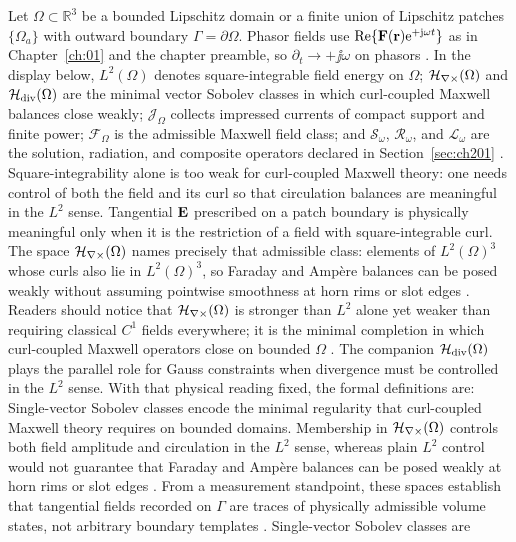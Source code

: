 Let \(\Omega\subset\mathbb{R}^{3}\) be a bounded Lipschitz domain or a finite union of Lipschitz patches \(\{\Omega_a\}\) with outward boundary \(\Gamma=\partial\Omega\). Phasor fields use \(\Re\{\mathbf{F}(\mathbf{r})\mathrm{e}^{+\mathrm{j}\omega t}\}\) as in Chapter~\ref{ch:01} and the chapter preamble, so \(\partial_t\to+\jj\omega\) on phasors \cite{stratton1941}.
In the display below, \(L^{2}(\Omega)\) denotes square-integrable field energy on \(\Omega\);
\(\mathcal{H}_{\nabla\times}(\Omega)\) and \(\mathcal{H}_{\mathrm{div}}(\Omega)\) are the minimal vector Sobolev classes in which
curl-coupled Maxwell balances close weakly; \(\mathcal{J}_\Omega\) collects impressed
currents of compact support and finite power; \(\mathcal{F}_\Omega\) is the admissible
Maxwell field class; and \(\mathcal{S}_\omega\), \(\mathcal{R}_\omega\), and
\(\mathcal{L}_\omega\) are the solution, radiation, and composite operators declared in
Section~\ref{sec:ch201} \cite{stratton1941}.
Square-integrability alone is too weak for curl-coupled Maxwell theory: one needs
control of both the field and its curl so that circulation balances are meaningful
in the \(L^{2}\) sense.
Tangential \(\mathbf{E}\) prescribed on a patch boundary is physically meaningful only when it is
the restriction of a field with square-integrable curl. The space \(\mathcal{H}_{\nabla\times}(\Omega)\) names
precisely that admissible class:
elements of \(L^{2}(\Omega)^{3}\) whose curls also lie in \(L^{2}(\Omega)^{3}\), so
Faraday and Amp\`ere balances can be posed weakly without assuming pointwise smoothness
at horn rims or slot edges \cite{stratton1941}. Readers should notice that
\(\mathcal{H}_{\nabla\times}(\Omega)\) is stronger than \(L^{2}\) alone yet weaker than requiring classical
\(C^{1}\) fields everywhere; it is the minimal completion in which curl-coupled
Maxwell operators close on bounded \(\Omega\) \cite{harrington2001}. The companion
\(\mathcal{H}_{\mathrm{div}}(\Omega)\) plays the parallel role for Gauss constraints when divergence must be
controlled in the \(L^{2}\) sense. With that physical reading fixed, the formal definitions
are:
Single-vector Sobolev classes encode the minimal regularity that curl-coupled Maxwell
theory requires on bounded domains. Membership in
\(\mathcal{H}_{\nabla\times}(\Omega)\) controls both field amplitude and circulation in the \(L^{2}\) sense,
whereas plain \(L^{2}\) control would not guarantee that Faraday and Amp\`ere balances
can be posed weakly at horn rims or slot edges \cite{stratton1941}. From a measurement
standpoint, these spaces establish that tangential fields recorded on \(\Gamma\) are traces
of physically admissible volume states, not arbitrary boundary templates
\cite{harrington2001}. Single-vector Sobolev classes are
